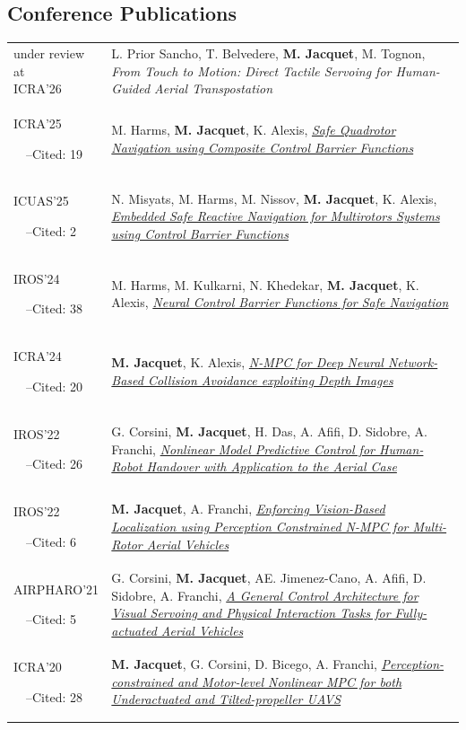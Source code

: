\documentclass[11pt,a4paper]{article}
\newlength{\colone}
\newlength{\coltwo}
\newcommand{\cited}[1]{\par\footnotesize{~~--Cited: #1}}
\newcommand{\notes}[1]{{\small\color{gray}\itshape #1}}
\newcommand{\me}{{\bfseries M. Jacquet}}
\begin{document}
\subsection{Conference Publications}
\begin{longtable}{@{}p{\colone}p{\coltwo}@{}}
	\makecell[tl]{under review at \\ ICRA'26} %
	& {
		L. Prior Sancho, T. Belvedere, \me, M. Tognon,
		\emph{From Touch to Motion: Direct Tactile Servoing for Human-Guided Aerial Transpostation}
	}
\\
	ICRA'25	\cited{19}
	& {
		M. Harms, \me, K. Alexis,
		\href{https://doi.org/10.1109/ICRA55743.2025.11127368}{\emph{Safe Quadrotor Navigation using Composite Control Barrier Functions}}
	}
\\
	ICUAS'25 \cited{2}
	& {
		N. Misyats, M. Harms, M. Nissov, \me, K. Alexis,
		\href{https://doi.org/10.1109/ICUAS65942.2025.11007827}{\emph{Embedded Safe Reactive Navigation for Multirotors Systems using Control Barrier Functions}}
	}
\\
	IROS'24	\cited{38}
	& {
		M. Harms, M. Kulkarni, N. Khedekar, \me, K. Alexis,
		\href{https://doi.org/10.1109/IROS58592.2024.10802694}{\emph{Neural Control Barrier Functions for Safe Navigation}}
	}
\\
	ICRA'24	\cited{20}
	& {
		\me, K. Alexis,
		\href{https://doi.org/10.1109/ICRA57147.2024.10610572}{\emph{N-MPC for Deep Neural Network-Based Collision Avoidance exploiting Depth Images}}
	}
\\
	IROS'22	\cited{26}
	& {
		G. Corsini, \me, H. Das, A. Afifi, D. Sidobre, A. Franchi,
		\href{https://doi.org/10.1109/IROS47612.2022.9981045}{\emph{Nonlinear Model Predictive Control for Human-Robot Handover with Application to the Aerial Case}}
	}
\\
	IROS'22	\cited{6}
	& {
		\me, A. Franchi,
		\href{https://doi.org/10.1109/IROS47612.2022.9981643}{\emph{Enforcing Vision-Based Localization using Perception Constrained N-MPC for Multi-Rotor Aerial Vehicles}}
	}
\\
	AIRPHARO'21	\cited{5} 
	& {
		G. Corsini, \me, AE. Jimenez-Cano, A. Afifi, D. Sidobre, A. Franchi,
		\href{https://doi.org/10.1109/AIRPHARO52252.2021.9571053}{\emph{A General Control Architecture for Visual Servoing and Physical Interaction Tasks for Fully-actuated Aerial Vehicles}}
	}
\\
	ICRA'20	\cited{28}
	& {
		\me, G. Corsini, D. Bicego, A. Franchi,
		\href{https://doi.org/10.1109/ICRA40945.2020.9197281}{\emph{Perception-constrained and Motor-level Nonlinear MPC for both Underactuated and Tilted-propeller UAVS}}
	}
\end{longtable}
\end{document}
